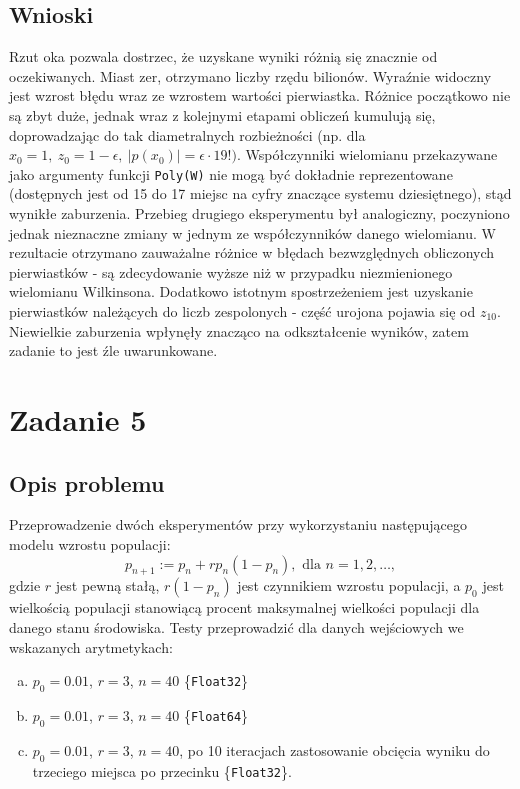 \documentclass{classrep}
\begin{document}
	\subsection{Wnioski}
		Rzut oka pozwala dostrzec, że uzyskane wyniki różnią się znacznie od oczekiwanych. Miast zer, otrzymano liczby rzędu bilionów. Wyraźnie widoczny jest wzrost błędu wraz ze wzrostem wartości pierwiastka. Różnice początkowo nie są zbyt duże, jednak wraz z kolejnymi etapami obliczeń kumulują się, doprowadzając do tak diametralnych rozbieżności (np. dla $x_0 = 1, ~z_0 = 1-\epsilon, ~|p(x_0)|=\epsilon \cdot 19!)$. Współczynniki wielomianu przekazywane jako argumenty funkcji \texttt{Poly(W)} nie mogą być dokładnie reprezentowane (dostępnych jest od 15 do 17 miejsc na cyfry znaczące systemu dziesiętnego), stąd wynikłe zaburzenia.
		Przebieg drugiego eksperymentu był analogiczny, poczyniono jednak nieznaczne zmiany w jednym ze współczynników danego wielomianu. W rezultacie otrzymano zauważalne różnice w błędach bezwzględnych obliczonych pierwiastków - są zdecydowanie wyższe niż w przypadku niezmienionego wielomianu Wilkinsona. Dodatkowo istotnym spostrzeżeniem jest uzyskanie pierwiastków należących do liczb zespolonych - część urojona pojawia się od $z_{10}$. Niewielkie zaburzenia wpłynęły znacząco na odkształcenie wyników, zatem zadanie to jest źle uwarunkowane.
\section{Zadanie 5}
	\subsection{Opis problemu}
		Przeprowadzenie dwóch eksperymentów przy wykorzystaniu następującego modelu wzrostu populacji: $$p_{n+1} := p_n + rp_n(1-p_n), \text{ dla } n = 1, 2, \dots,$$
		gdzie $r$ jest pewną stałą, $r(1-p_n)$ jest czynnikiem wzrostu populacji, a $p_0$ jest wielkością populacji stanowiącą procent maksymalnej wielkości populacji dla danego stanu środowiska.
		Testy przeprowadzić dla danych wejściowych we wskazanych arytmetykach:
		\begin{enumerate}[(a)]
			\item $p_0 = 0.01$, $r = 3$, $n = 40$ \{\texttt{Float32}\}
			\item $p_0 = 0.01$, $r = 3$, $n = 40$ \{\texttt{Float64}\}
			\item $p_0 = 0.01$, $r = 3$, $n = 40$, po 10 iteracjach zastosowanie obcięcia wyniku do trzeciego miejsca po przecinku \{\texttt{Float32}\}.
		\end{enumerate}
\end{document}
